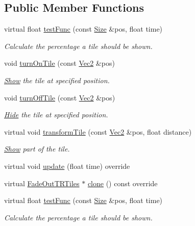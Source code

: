 \subsection*{Public Member Functions}
\begin{DoxyCompactItemize}
\item 
virtual float \hyperlink{classFadeOutTRTiles_aed87971151a43d41b598a8c65f0e7d8f}{test\+Func} (const \hyperlink{classSize}{Size} \&pos, float time)
\begin{DoxyCompactList}\small\item\em Calculate the percentage a tile should be shown. \end{DoxyCompactList}\item 
void \hyperlink{classFadeOutTRTiles_a9054a06a45fd2f88a3bab16643258123}{turn\+On\+Tile} (const \hyperlink{classVec2}{Vec2} \&pos)
\begin{DoxyCompactList}\small\item\em \hyperlink{classShow}{Show} the tile at specified position. \end{DoxyCompactList}\item 
void \hyperlink{classFadeOutTRTiles_a4db8d8897034bc19d449560174bd29fa}{turn\+Off\+Tile} (const \hyperlink{classVec2}{Vec2} \&pos)
\begin{DoxyCompactList}\small\item\em \hyperlink{classHide}{Hide} the tile at specified position. \end{DoxyCompactList}\item 
virtual void \hyperlink{classFadeOutTRTiles_affe9ea8485d27ecab09eb0e9ee5d0129}{transform\+Tile} (const \hyperlink{classVec2}{Vec2} \&pos, float distance)
\begin{DoxyCompactList}\small\item\em \hyperlink{classShow}{Show} part of the tile. \end{DoxyCompactList}\item 
virtual void \hyperlink{classFadeOutTRTiles_a29c5392c4e1dee18689599e6a3d31671}{update} (float time) override
\item 
virtual \hyperlink{classFadeOutTRTiles}{Fade\+Out\+T\+R\+Tiles} $\ast$ \hyperlink{classFadeOutTRTiles_af7a6bf6cfa4ef6cccae911b026e49b48}{clone} () const override
\item 
virtual float \hyperlink{classFadeOutTRTiles_ad60de48e058a74552cec41eea2bb2507}{test\+Func} (const \hyperlink{classSize}{Size} \&pos, float time)
\begin{DoxyCompactList}\small\item\em Calculate the percentage a tile should be shown. \end{DoxyCompactList}\item 

\end{DoxyCompactItemize}
